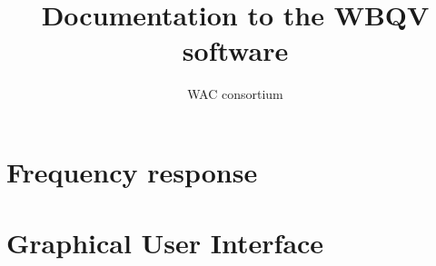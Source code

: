 \documentclass[a4paper, 12pt]{report}
\title{Documentation to the WBQV software}
\author{WAC consortium}
\begin{document}
\maketitle

\chapter{Frequency response}


\chapter{Graphical User Interface}

\end{document}

